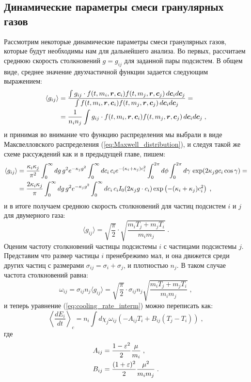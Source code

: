 \subsection{Динамические параметры смеси гранулярных газов}
Рассмотрим некоторые динамические параметры смеси гранулярных газов, которые будут необходимы нам для дальнейшего анализа.
Во первых, рассчитаем среднюю скорость столкновений $g=g_{ij}$ для заданной пары подсистем. В общем виде, среднее значение
двухчастичной функции задается следующим выражением:
\begin{equation}
  \begin{split}
    \langle g_{ij}\rangle &= \frac{\int g_{ij}\cdot f(t,m_i,\bm{r},\bm{c}_i)f(t,m_j,\bm{r},\bm{c}_j)\,d\bm{c}_id\bm{c}_j}
    {\int f(t,m_i,\bm{r},\bm{c}_i)f(t,m_j,\bm{r},\bm{c}_j)\,d\bm{c}_id\bm{c}_j} = \\
    &= \frac{1}{n_in_j}\int g_{ij}\cdot f(t,m_i,\bm{r},\bm{c}_i)f(t,m_j,\bm{r},\bm{c}_j)\,d\bm{c}_id\bm{c}_j\;,
  \end{split}
\end{equation}
и принимая во внимание что функцию распределения мы выбрали в виде Максвелловского распределения (\ref{eq:Maxwell_distribution}), и 
следуя такой же схеме рассуждений как и в предыдущей главе, пишем:
\begin{equation}
  \begin{split}
    \langle g_{ij}\rangle &= \frac{\kappa_i\kappa_j}{\pi^2}\int_{0}^{\infty}dg\,g^2e^{-\kappa_jg^2}\int_{0}^{\infty}dc_i\,c_ie^{-(\kappa_i+\kappa_j)c^2_i}
    \int_{0}^{2\pi}d\phi\int_{0}^{2\pi}d\gamma\,\exp(2\kappa_jgc_i\cos\gamma)=\\
    &=\frac{2\kappa_i\kappa_j}{\pi}\int_{0}^{\infty}dg\,g^2e^{-\kappa_jg^2}\int_{0}^{\infty}dc_i\,c_iI_0(2\kappa_jg\cdot c_i)
    \exp\left(-(\kappa_i+\kappa_j)c^2_i\right)\;,
  \end{split}
\end{equation}
и в итоге получаем среднюю скорость столкновений для частиц подсистем $i$ и $j$ для двумерного газа:
\begin{equation}
  \langle g_{ij}\rangle = \sqrt{\frac{\pi}{2}}\cdot\sqrt{\frac{m_iT_j+m_jT_i}{m_im_j}}\;.
\end{equation}
Оценим частоту столкновений частицы подсистемы $i$ с частицами подсистемы $j$. Представим что размер частицы $i$ пренебрежимо
мал, и она движется среди других частиц с размерами $\sigma_{ij}=\sigma_i+\sigma_j$, и плотностью $n_j$. В таком случае частота
столкновений равна:
\begin{equation}
  \omega_{ij} = \sigma_{ij}n_j\langle g_{ij}\rangle=\sqrt{\frac{\pi}{2}}\cdot\sigma_{ij}n_j\sqrt{\frac{m_iT_j+m_jT_i}{m_im_j}}\;,
\end{equation}
и теперь уравнение (\ref{eq:cooling_rate_interm}) можно переписать как:
\begin{equation}
  \left\langle\frac{dE_i}{dt}\right\rangle_c = n_i\int d\chi_j\omega_{ij}\left(-A_{ij}T_i+B_{ij}(T_j-T_i)\right)\;,
\end{equation}
где
\begin{equation}
  \begin{split}
    A_{ij} &= \frac{1-\varepsilon^2}{2}\frac{\mu}{m_i}\;,\\
    B_{ij} &= \frac{(1+\varepsilon)^2}{2}\frac{\mu^2}{m_im_j}\;.
  \end{split}
\end{equation}